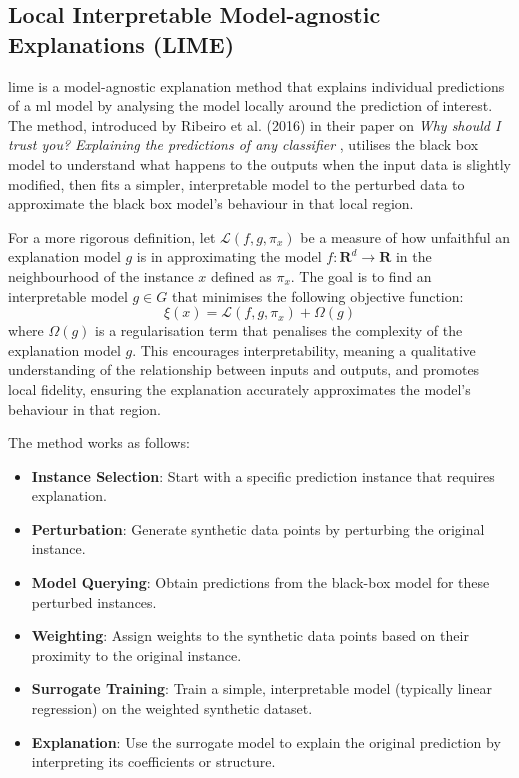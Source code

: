 \subsection{Local Interpretable Model-agnostic Explanations (LIME)} \label{sec:lime}

\acrfull{lime} is a model-agnostic explanation method that explains individual predictions of a \acrlong{ml} model by analysing the model locally around the prediction of interest. The method, introduced by Ribeiro et al. (2016) in their paper on \textit{Why should I trust you? Explaining the predictions of any classifier} \cite{Ribeiro2016}, utilises the black box model to understand what happens to the outputs when the input data is slightly modified, then fits a simpler, interpretable model to the perturbed data to approximate the black box model's behaviour in that local region.

For a more rigorous definition, let $\mathcal{L}(f,g,\pi_x)$ be a measure of how unfaithful an explanation model $g$ is in approximating the model $f:\mathbf{R}^d \to \mathbf{R}$ in the neighbourhood of the instance $x$ defined as $\pi_x$. The goal is to find an interpretable model $g \in G$ that minimises the following objective function:
\begin{equation}
    \xi(x) = \mathcal{L}(f, g, \pi_x) + \Omega(g)
\end{equation}
where $\Omega(g)$ is a regularisation term that penalises the complexity of the explanation model $g$. This encourages interpretability, meaning a qualitative understanding of the relationship between inputs and outputs, and promotes local fidelity, ensuring the explanation accurately approximates the model's behaviour in that region. 

The method works as follows:
\begin{itemize}
    \item \textbf{Instance Selection}: Start with a specific prediction instance that requires explanation.
    \item \textbf{Perturbation}: Generate synthetic data points by perturbing the original instance.
    \item \textbf{Model Querying}: Obtain predictions from the black-box model for these perturbed instances.
    \item \textbf{Weighting}: Assign weights to the synthetic data points based on their proximity to the original instance.
    \item \textbf{Surrogate Training}: Train a simple, interpretable model (typically linear regression) on the weighted synthetic dataset.
    \item \textbf{Explanation}: Use the surrogate model to explain the original prediction by interpreting its coefficients or structure.
\end{itemize}

